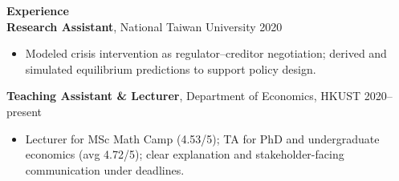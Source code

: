 \documentclass[11pt,letterpaper]{article}
\begin{document}
{\large \textbf{Experience}}\\[-0.5pt]
\textbf{Research Assistant}, National Taiwan University \hfill 2020\\
\vspace{-6pt}
\begin{itemize}
  \item Modeled crisis intervention as regulator--creditor negotiation; derived and simulated equilibrium predictions to support policy design.
\end{itemize}
\textbf{Teaching Assistant \& Lecturer}, Department of Economics, HKUST \hfill 2020--present\\
\vspace{-6pt}
\begin{itemize}
  \item Lecturer for MSc Math Camp (4.53/5); TA for PhD and undergraduate economics (avg 4.72/5); clear explanation and stakeholder-facing communication under deadlines.
\end{itemize}

\vspace{0.15pt}
\end{document}
